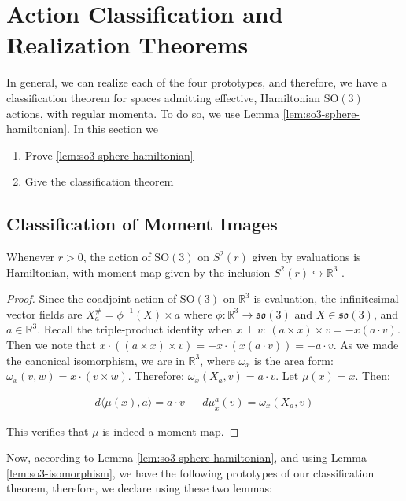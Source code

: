 \section{Action Classification and Realization Theorems}
In general, we can realize each of the four prototypes, and therefore, we have a classification theorem for spaces admitting effective, Hamiltonian $\mathrm{SO}(3)$ actions, with regular momenta. To do so, we use Lemma \ref{lem:so3-sphere-hamiltonian}. In this section we 

\begin{enumerate}
    \item Prove \ref{lem:so3-sphere-hamiltonian}
    \item Give the classification theorem
\end{enumerate}

\subsection{Classification of Moment Images}

\begin{lemma}\label{lem:so3-sphere-hamiltonian}
Whenever $r>0$, the action of $\mathrm{SO}(3)$ on $S^2(r)$ given by evaluations is Hamiltonian, with moment map given by the inclusion $S^2(r) \hookrightarrow \mathbb{R}^3$ \textcite{MarsdenWeinstein1974}.
\end{lemma}
\begin{proof}
\label{MomentMapIsInclusion}
Since the coadjoint action of $\mathrm{SO}(3)$ on $\mathbb{R}^3$ is evaluation, the infinitesimal vector fields are $X^{\#}_a = \phi^{-1}(X) \times a$ where $\phi \colon \mathbb{R}^3 \to \mathfrak{so}(3)$ and $X \in \mathfrak{so}(3)$, and $a \in \mathbb{R}^3$. Recall the triple-product identity when $x \perp v$: $(a \times x) \times v = -x (a \cdot v)$. Then we note that $x \cdot ((a \times x) \times v) = -x \cdot (x (a \cdot v)) = - a \cdot v$. As we made the canonical isomorphism, we are in $\mathbb{R}^{3}$, where $\omega_{x}$ is the area form: $\omega_{x}(v,w) = x \cdot (v \times w)$. Therefore:  $\omega_{x}(X_{a}, v) = a \cdot v $. Let $\mu(x) = x$. Then: 

\begin{align}
d \langle \mu(x), a \rangle = a \cdot v &&  d \mu^{a}_{x}(v) = \omega_{x}(X_{a}, v)
\end{align}

\noindent This verifies that $\mu$ is indeed a moment map. 
\end{proof}
Now, according to Lemma \ref{lem:so3-sphere-hamiltonian}, and using Lemma \ref{lem:so3-isomorphism}, we have the following prototypes of our classification theorem, therefore, we declare using these two lemmas: 

